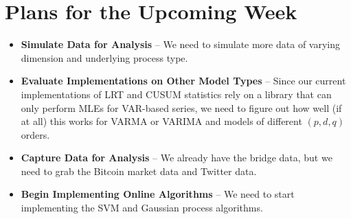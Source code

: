 \documentclass[10pt,letterpaper]{article}
\begin{document}
\section{Plans for the Upcoming Week}

\begin{itemize}
\item \textbf{Simulate Data for Analysis} -- We need to simulate more data of varying dimension and underlying process type. 
\item \textbf{Evaluate Implementations on Other Model Types} -- Since our current implementations of LRT and CUSUM statistics rely on a library that can only perform MLEs for VAR-based series, we need to figure out how well (if at all) this works for VARMA or VARIMA and models of different $(p,d,q)$ orders.
\item \textbf{Capture Data for Analysis} -- We already have the bridge data, but we need to grab the Bitcoin market data and Twitter data.
\item \textbf{Begin Implementing Online Algorithms} -- We need to start implementing the SVM and Gaussian process algorithms.
\end{itemize}

%
%
\end{document}
